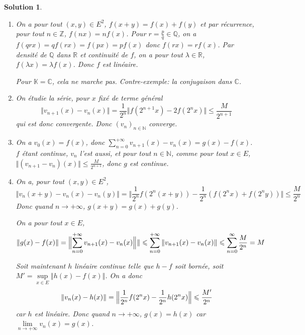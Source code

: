 \documentclass[12pt]{article}
\newtheorem{solution}{Solution}[section]
\theoremstyle{remark}
\newcommand{\K}{\mathbb{K}} \newcommand{\R}{\mathbb{R}}
\newcommand{\C}{\mathbb{C}} \newcommand{\Q}{\mathbb{Q}}
\newcommand{\N}{\mathbb{N}} \newcommand{\Z}{\mathbb{Z}}
\begin{document}
\begin{solution}
	\phantom{}
	\begin{enumerate}
		\item On a pour tout $(x,y)\in E^{2}$, $f(x+y)=f(x)+f(y)$ et par récurrence, pour tout $n\in\Z$, $f(nx)=nf(x)$. Pour $r=\frac{p}{q}\in\Q$, on a $f(qrx)=qf(rx)=f(px)=pf(x)$ donc $f(rx)=rf(x)$. Par densité de $\Q$ dans $\R$ et continuité de $f$, on a pour tout $\lambda\in\R$, $f(\lambda x)=\lambda f(x)$. Donc $f$ est linéaire.
		
		Pour $\K=\C$, cela ne marche pas. Contre-exemple: la conjugaison dans $\C$.

		\item On étudie la série, pour $x$ fixé de terme général 
		$$\Vert v_{n+1}(x)-v_{n}(x)\Vert=\frac{1}{2^{n}}\Vert f(2^{n+1}x)-2f(2^{n}x)\Vert\leqslant\frac{M}{2^{n+1}}$$
		qui est donc convergente. Donc $(v_{n})_{n\in\N}$ converge.

		\item On a $v_{0}(x)=f(x)$, donc $\sum_{n=0}^{+\infty}v_{n+1}(x)-v_{n}(x)=g(x)-f(x)$. $f$ étant continue, $v_{n}$ l'est aussi, et pour tout $n\in\N$, comme pour tout $x\in E$, $\Vert (v_{n+1}-v_{n})(x)\Vert\leqslant\frac{M}{2^{n+1}}$, donc $g$ est continue.
		
		\item On a, pour tout $(x,y)\in E^{2}$,
		$$\Vert v_{n}(x+y)-v_{n}(x)-v_{n}(y)\Vert=\Vert \frac{1}{2^{n}}f(2^{n}(x+y))-\frac{1}{2^{n}}(f(2^{n}x)+f(2^{n}y))\Vert\leqslant\frac{M}{2^{n}}$$
		Donc quand $n\to+\infty$, $g(x+y)=g(x)+g(y)$.

		On a pour tout $x\in E$, 
		$$\Vert g(x)-f(x)\Vert=\Bigl\lVert\sum_{n=0}^{+\infty}v_{n+1}(x)-v_{n}(x)\Bigr\Vert\rVert\leqslant\sum_{n=0}^{+\infty}\Vert v_{n+1}(x)-v_{n}(x)\Vert\leqslant\sum_{n=0}^{\infty}\frac{M}{2^{n}}=M$$

		Soit maintenant $h$ linéaire continue telle que $h-f$ soit bornée, soit $M'=\sup\limits_{x\in E}\Vert h(x)-f(x)\Vert$. On a donc 
		$$\Vert v_{n}(x)-h(x)\Vert=\Bigl\Vert\frac{1}{2^{n}}f(2^{n}x)-\frac{1}{2^{n}}h(2^{n}x)\Bigr\Vert\leqslant\frac{M'}{2^{n}}$$
		car $h$ est linéaire. Donc quand $n\to+\infty$, $g(x)=h(x)$ car $\lim\limits_{n\to+\infty}v_{n}(x)=g(x)$.
	\end{enumerate}
\end{solution}
\end{document}
